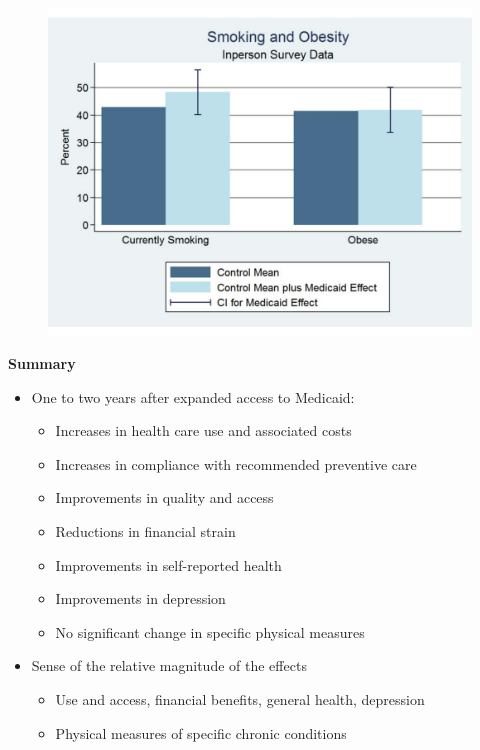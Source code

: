 \documentclass[notes=show]{beamer}
\begin{document}
\begin{frame}[plain]
	
	\begin{figure}
	\includegraphics[scale=0.40]{./lecture_includes/baicker_18.pdf}
	\end{figure}
\end{frame}

\begin{frame}[plain]
	\begin{center}
	\textbf{Summary}
	\end{center}
	
	\begin{itemize}
	\item One to two years after expanded access to Medicaid:
		\begin{itemize}
		\item Increases in health care use and associated costs
		\item Increases in compliance with recommended preventive care
		\item Improvements in quality and access
		\item Reductions in financial strain
		\item Improvements in self-reported health
		\item Improvements in depression
		\item No significant change in specific physical measures
		\end{itemize}
	\item Sense of the relative magnitude of the effects
		\begin{itemize}
		\item Use and access, financial benefits, general health, depression 
		\item Physical measures of specific chronic conditions
		\end{itemize}
	\end{itemize}
\end{frame}
\end{document}
